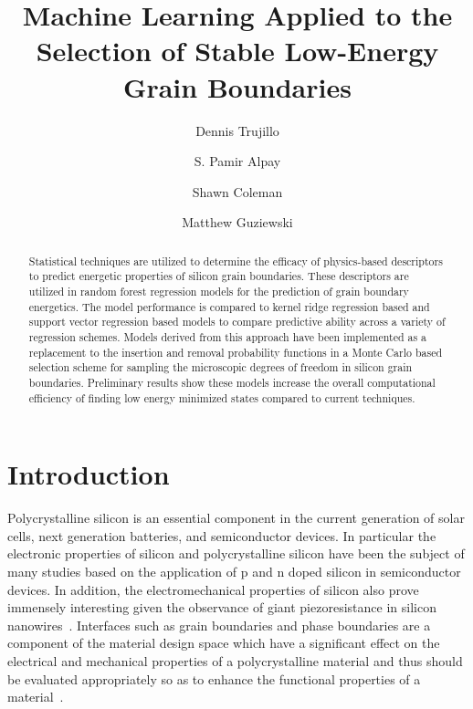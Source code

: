 \documentclass[aip,reprint,longbibliography,amsmath,amssymb,twocolumn,superscriptaddress]{revtex4-1}
\begin{document}
\title{Machine Learning Applied to the Selection of Stable Low-Energy Grain Boundaries}
\author{Dennis Trujillo}
\author{S. Pamir Alpay}
\author{Shawn Coleman}
\author{Matthew Guziewski}



\begin{abstract}
Statistical techniques are utilized to determine the efficacy of physics-based descriptors to predict energetic properties of silicon grain boundaries. 
%
These descriptors are utilized in random forest regression models for the prediction of grain boundary energetics. 
%
The model performance is compared to kernel ridge regression based and support vector regression based models to compare predictive ability across a variety of regression schemes. 
%
Models derived from this approach have been implemented as a replacement to the insertion and removal probability functions in a Monte Carlo based selection scheme for sampling the microscopic degrees of freedom in silicon grain boundaries.  
%
Preliminary results show these models increase the overall computational efficiency of finding low energy minimized states compared to current techniques. 
\end{abstract}

\maketitle 

\section{Introduction}
Polycrystalline silicon is an essential component in the current generation of solar cells, next generation batteries, and semiconductor devices. 
%
In particular the electronic properties of silicon and polycrystalline silicon have been the subject of many studies based on the application of p and n doped silicon in semiconductor devices.
%
In addition, the electromechanical properties of silicon also prove immensely interesting given the observance of giant piezoresistance in silicon nanowires~\cite{He2006}. 
%
Interfaces such as grain boundaries and phase boundaries are a component of the material design space which have a significant effect on the electrical and mechanical properties of a polycrystalline material and thus should be evaluated appropriately so as to enhance the functional properties of a material~\cite{Zhang2013}. 
\end{document}
